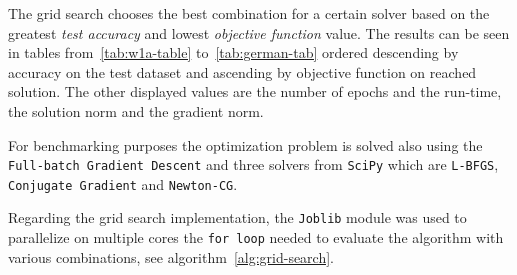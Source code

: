 The grid search chooses the best combination for a certain solver based on the greatest \emph{test accuracy} and lowest \emph{objective function} value. The results can be seen in tables from~\vref{tab:w1a-table} to~\ref{tab:german-tab} ordered descending by accuracy on the test dataset and ascending by objective function on reached solution. The other displayed values are the number of epochs and the run-time, the solution norm and the gradient norm.

For benchmarking purposes the optimization problem is solved also using the \texttt{Full-batch Gradient Descent} and three solvers from \texttt{SciPy} which are \texttt{L-BFGS}, \texttt{Conjugate Gradient} and \texttt{Newton-CG}.%

Regarding the grid search implementation, the \texttt{Joblib} module was used to parallelize on multiple cores the \texttt{for loop} needed to evaluate the algorithm with various combinations, see algorithm~\vref{alg:grid-search}.\par\smallskip






